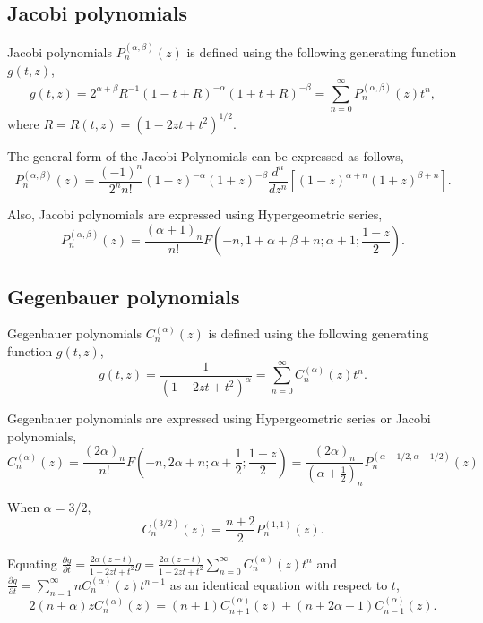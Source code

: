 \documentclass[12pt]{article}
\newcommand{\henbibun}[2]{\frac{\partial {#1}}{\partial {#2}}}
\begin{document}
\subsection{Jacobi polynomials}
Jacobi polynomials $P^{(\alpha,\beta)}_{n} (z)$ is defined using the following generating function $g(t,z)$,
\begin{equation}
 g(t,z) = 2^{\alpha+\beta} R^{-1} (1-t+R)^{-\alpha} (1+t+R)^{-\beta} = \sum_{n=0}^{\infty} P^{(\alpha,\beta)}_{n} (z) t^n,
\end{equation}
where $R = R(t,z) = \left(1 - 2zt + t^2\right)^{1/2}$.

The general form of the Jacobi Polynomials can be expressed as follows,
\begin{equation}
 P^{(\alpha, \beta)}_n (z) = \frac{(-1)^n}{2^n n!} (1-z)^{-\alpha} (1+z)^{-\beta} \frac{d^n}{dz^n}\left[(1-z)^{\alpha+n} (1+z)^{\beta+n}\right].
\end{equation}

Also, Jacobi polynomials are expressed using Hypergeometric series,
\begin{equation}
 P^{(\alpha,\beta)}_{n} (z) = \frac{(\alpha+1)_n}{n!} F \left(-n, 1+\alpha+\beta+n; \alpha+1; \frac{1-z}{2}\right).
\end{equation}

\subsection{Gegenbauer polynomials}
Gegenbauer polynomials $C^{(\alpha)}_{n} (z)$ is defined using the following generating function $g(t,z)$,
\begin{equation}
 g(t,z) = \frac{1}{\left(1 - 2zt + t^2\right)^\alpha} = \sum_{n=0}^{\infty} C^{(\alpha)}_{n} (z) t^n.\label{gegen_def}
\end{equation}

Gegenbauer polynomials are expressed using Hypergeometric series or Jacobi polynomials,
\begin{equation}
 C^{(\alpha)}_{n} (z) = \frac{(2\alpha)_n}{n!} F \left(-n, 2\alpha + n; \alpha+\frac{1}{2}; \frac{1-z}{2}\right) = \frac{(2\alpha)_n}{\left(\alpha + \frac{1}{2}\right)_n} P^{(\alpha - 1/2,\alpha - 1/2)}_{n} (z)
\end{equation}

When $\alpha=3/2$,
\begin{equation}
 C^{(3/2)}_{n} (z) = \frac{n+2}{2} P^{(1,1)}_{n} (z).
\end{equation}

Equating $\henbibun{g}{t} = \frac{2\alpha (z-t)}{1 - 2zt + t^2} g = \frac{2\alpha (z-t)}{1 - 2zt + t^2} \sum_{n=0}^{\infty} C^{(\alpha)}_{n} (z) t^n$ and
$\henbibun{g}{t} = \sum_{n=1}^{\infty} nC^{(\alpha)}_{n} (z) t^{n-1}$ as an identical equation with respect to $t$,
\begin{equation}
 2(n+\alpha)z C^{(\alpha)}_{n} (z) = (n+1) C^{(\alpha)}_{n+1}(z) + (n+2\alpha - 1) C^{(\alpha)}_{n-1}(z).
\end{equation}
\end{document}
